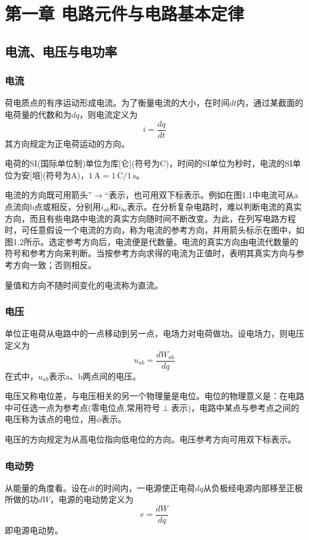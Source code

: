 \chapter{第一章 电路元件与电路基本定律}

\section{电流、电压与电功率}
\subsection{电流}
荷电质点的有序运动形成电流。为了衡量电流的大小，在时间$dt$内，通过某截面的电荷量的代数和为$dq$，则电流定义为
\[
i=\frac{dq}{dt}
\]
其方向规定为正电荷运动的方向。

电荷的SI(国际单位制)单位为库[仑](符号为$\mathrm{C}$)，时间的SI单位为秒时，电流的SI单位为安[培](符号为$\mathrm{A}$)，$1\,\mathrm{A}=1\,\mathrm{C}/1\,\mathrm{s}$。

电流的方向既可用箭头”$\rightarrow$“表示，也可用双下标表示。例如在图1.1中电流可从a点流向b点或相反，分别用$i_{ab}$和$i_{ba}$表示。在分析复杂电路时，难以判断电流的真实方向，而且有些电路中电流的真实方向随时间不断改变。为此，在列写电路方程时，可任意假设一个电流的方向，称为电流的参考方向，并用箭头标示在图中，如图1.2所示。选定参考方向后，电流便是代数量。电流的真实方向由电流代数量的符号和参考方向来判断。当按参考方向求得的电流为正值时，表明其真实方向与参考方向一致；否则相反。

量值和方向不随时间变化的电流称为直流。

\subsection{电压}
单位正电荷从电路中的一点移动到另一点，电场力对电荷做功。设电场力，则电压定义为
\[
u_{ab}=\frac{dW_{ab}}{dq}
\]
在式中，$u_{ab}$表示a、b两点间的电压。

电压又称电位差，与电压相关的另一个物理量是电位。电位的物理意义是：在电路中可任选一点为参考点(零电位点,常用符号$\perp$表示)，电路中某点与参考点之间的电压称为该点的电位，用$\phi$表示。

电压的方向规定为从高电位指向低电位的方向。电压参考方向可用双下标表示。

\subsection{电动势}
从能量的角度看。设在$dt$的时间内，一电源使正电荷$dq$从负极经电源内部移至正极所做的功$dW$，电源的电动势定义为
\[
e=\frac{dW}{dq}
\]
即电源电动势。

